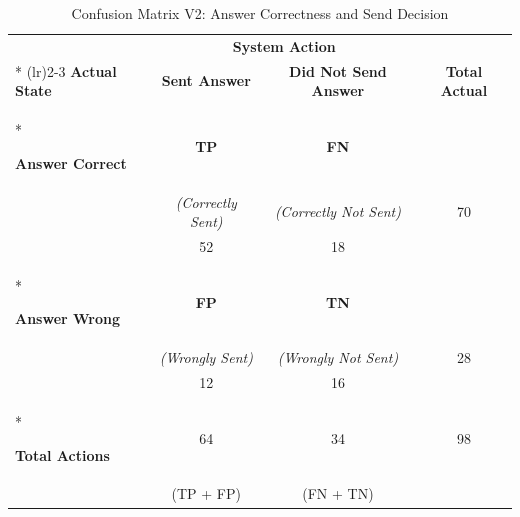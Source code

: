 \begin{longtable}{l|cc|c}

\caption[Confusion Matrix V2: Answer Correctness and Send Decision]{
    Confusion Matrix V2: Answer Correctness and Send Decision
} \label{tab:correctness_dispatch_cm_v2} \\

\toprule
\multicolumn{1}{c}{} & \multicolumn{2}{c}{\textbf{System Action}} & \multicolumn{1}{c}{} \\*
\cmidrule(lr){2-3}
\textbf{Actual State} & \textbf{Sent Answer} & \textbf{Did Not Send Answer} & \textbf{Total Actual} \\*
\midrule
\endfirsthead

\textbf{Answer Correct} & \textbf{TP} & \textbf{FN} & \\
                      & \textit{(Correctly Sent)} & \textit{(Correctly Not Sent)} & 70 \\
                      & 52 & 18 & \\*
\midrule

\textbf{Answer Wrong} & \textbf{FP} & \textbf{TN} & \\
                     & \textit{(Wrongly Sent)} & \textit{(Wrongly Not Sent)} & 28 \\
                     & 12 & 16 & \\*
\midrule

\textbf{Total Actions} & 64 & 34 & 98 \\
                       & (TP + FP) & (FN + TN) & \\

\end{longtable}

\makeatletter
\let\@currsize\normalsize
\makeatother

